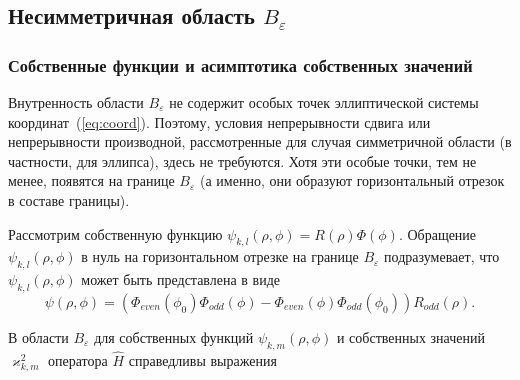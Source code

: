 \subsection{Несимметричная область $B_\varepsilon$}\label{sec:ch2/sec2/sub3}
\subsubsection{Собственные функции и асимптотика собственных значений}\label{sec:ch2/sec2/sub3/sub1}


Внутренность области $B_\varepsilon$ не содержит особых точек эллиптической системы координат~(\ref{eq:coord}). Поэтому, условия непрерывности сдвига или непрерывности производной, рассмотренные для случая симметричной области (в частности, для эллипса), здесь не требуются.
Хотя эти особые точки, тем не менее, появятся на границе  $B_\varepsilon$ (а именно, они образуют горизонтальный отрезок в составе границы).

Рассмотрим собственную функцию $\psi_{k,l}(\rho,\phi) = R(\rho)\Phi(\phi)$.
Обращение  $\psi_{k,l}(\rho,\phi) $ в нуль на горизонтальном отрезке на границе  $B_\varepsilon$
подразумевает, что $\psi_{k,l}(\rho,\phi)$ может быть представлена в виде
\[
\psi(\rho,\phi) = 
    \left(
    \Phi_{even}(\phi_0) \Phi_{odd}(\phi) - \Phi_{even}(\phi) \Phi_{odd}(\phi_0) 
    \right) R_{odd}(\rho).
\]

В области  $B_\varepsilon$ для собственных функций $\psi_{k, m}(\rho, \phi)$ и собственных значений $\varkappa^2_{k, m}$ оператора $\hat{H}$ справедливы выражения

